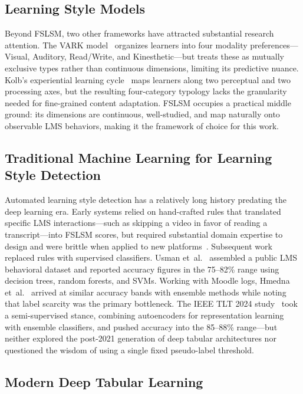 \documentclass[journal, onecolumn]{IEEEtran}
\begin{document}
\subsection{Learning Style Models}

Beyond FSLSM, two other frameworks have attracted substantial research attention. The VARK model~\cite{fleming1992vark} organizes learners into four modality preferences---Visual, Auditory, Read/Write, and Kinesthetic---but treats these as mutually exclusive types rather than continuous dimensions, limiting its predictive nuance. Kolb's experiential learning cycle~\cite{kolb1984experiential} maps learners along two perceptual and two processing axes, but the resulting four-category typology lacks the granularity needed for fine-grained content adaptation. FSLSM occupies a practical middle ground: its dimensions are continuous, well-studied, and map naturally onto observable LMS behaviors, making it the framework of choice for this work.

\subsection{Traditional Machine Learning for Learning Style Detection}

Automated learning style detection has a relatively long history predating the deep learning era. Early systems relied on hand-crafted rules that translated specific LMS interactions---such as skipping a video in favor of reading a transcript---into FSLSM scores, but required substantial domain expertise to design and were brittle when applied to new platforms~\cite{graf2007providing}. Subsequent work replaced rules with supervised classifiers. Usman et~al.~\cite{usman2023github} assembled a public LMS behavioral dataset and reported accuracy figures in the 75--82\% range using decision trees, random forests, and SVMs. Working with Moodle logs, Hmedna et~al.~\cite{hmedna2019github} arrived at similar accuracy bands with ensemble methods while noting that label scarcity was the primary bottleneck. The IEEE TLT 2024 study~\cite{ieee_tlt_2024} took a semi-supervised stance, combining autoencoders for representation learning with ensemble classifiers, and pushed accuracy into the 85--88\% range---but neither explored the post-2021 generation of deep tabular architectures nor questioned the wisdom of using a single fixed pseudo-label threshold.

\subsection{Modern Deep Tabular Learning}
\end{document}
